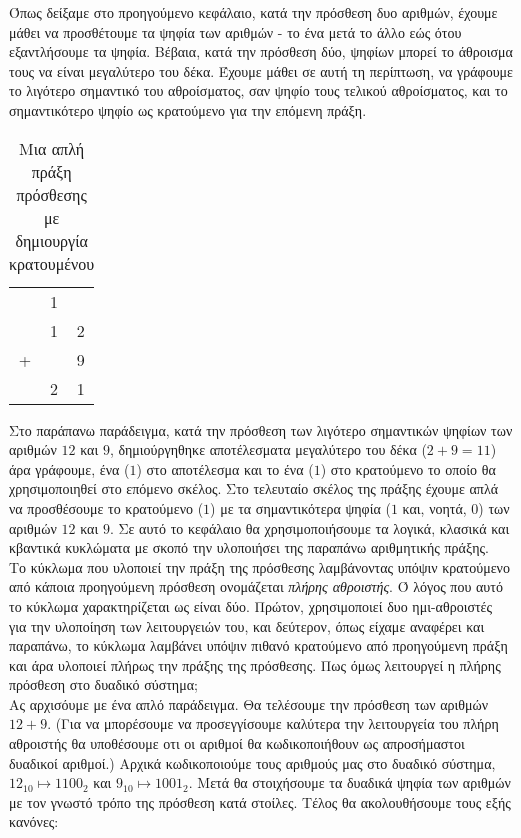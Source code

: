 Όπως δείξαμε στο προηγούμενο κεφάλαιο, κατά την πρόσθεση δυο αριθμών,
έχουμε μάθει να προσθέτουμε τα ψηφία των αριθμών - το ένα μετά το άλλο
εώς ότου εξαντλήσουμε τα ψηφία. Βέβαια, κατά την πρόσθεση δύο, ψηφίων
μπορεί το άθροισμα τους να είναι μεγαλύτερο του δέκα. Έχουμε μάθει σε
αυτή τη περίπτωση, να γράφουμε το λιγότερο σημαντικό του αθροίσματος,
σαν ψηφίο τους τελικού αθροίσματος, και το σημαντικότερο ψηφίο ως κρατούμενο
για την επόμενη πράξη.

\begin{table}[ht]
    \centering
    \begin{tabular}{c@{\,}c@{\,}c}
          & 1 &   \\
          & 1 & 2 \\
        + &   & 9 \\
        \hline
          & 2 & 1 \\
    \end{tabular}
    \label{tab:simple_decimal_addition_wcarry}
    \caption{Μια απλή πράξη πρόσθεσης με δημιουργία κρατουμένου}
\end{table}

Στο παράπανω παράδειγμα, κατά την πρόσθεση των λιγότερο σημαντικών ψηφίων
των αριθμών $12$ και $9$, δημιούργηθηκε αποτέλεσματα μεγαλύτερο του δέκα
($2 + 9 = 11$) άρα γράφουμε, ένα ($1$) στο αποτέλεσμα και το ένα ($1$) στο κρατούμενο
το οποίο θα χρησιμοποιηθεί στο επόμενο σκέλος. Στο τελευταίο σκέλος της πράξης έχουμε
απλά να προσθέσουμε το κρατούμενο ($1$) με τα σημαντικότερα ψηφία ($1$ και, νοητά, $0$)
των αριθμών $12$ και $9$. Σε αυτό το κεφάλαιο θα χρησιμοποιήσουμε τα λογικά, κλασικά και
κβαντικά κυκλώματα με σκοπό την υλοποιήσει της παραπάνω αριθμητικής πράξης.\\

Το κύκλωμα που υλοποιεί την πράξη της πρόσθεσης λαμβάνοντας υπόψιν κρατούμενο από
κάποια προηγούμενη πρόσθεση ονομάζεται \emph{πλήρης αθροιστής}. Ό λόγος που αυτό το κύκλωμα
χαρακτηρίζεται ως  είναι δύο. Πρώτον, χρησιμοποιεί δυο ημι-αθροιστές
για την υλοποίηση των λειτουργειών του, και δεύτερον, όπως είχαμε αναφέρει και
παραπάνω, το κύκλωμα λαμβάνει υπόψιν πιθανό κρατούμενο από προηγούμενη πράξη και
άρα υλοποιεί πλήρως την πράξης της πρόσθεσης. Πως όμως λειτουργεί η πλήρης πρόσθεση
στο δυαδικό σύστημα;\\

Ας αρχισόυμε με ένα απλό παράδειγμα. Θα τελέσουμε την πρόσθεση των αριθμών
$12 + 9$. (Για να μπορέσουμε να προσεγγίσουμε καλύτερα την λειτουργεία του πλήρη αθροιστής
θα υποθέσουμε οτι οι αριθμοί θα κωδικοποιήθουν ως απροσήμαστοι δυαδικοί  αριθμοί.)
Αρχικά κωδικοποιούμε τους αριθμούς μας στο δυαδικό σύστημα, $12_{10} \mapsto 1100_2$ και
$9_{10} \mapsto 1001_2$. Μετά θα στοιχήσουμε τα δυαδικά ψηφία των αριθμών με τον γνωστό τρόπο
της πρόσθεση κατά στοίλες. Τέλος θα ακολουθήσουμε τους εξής κανόνες:

